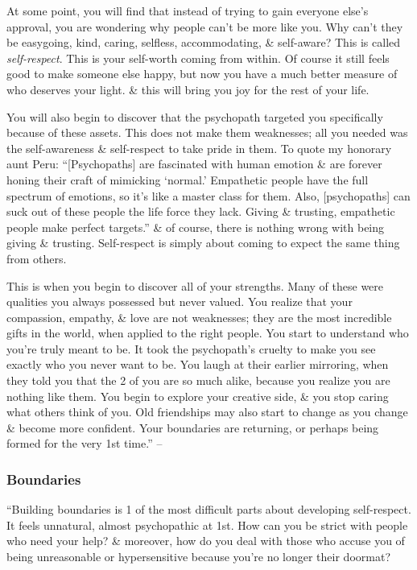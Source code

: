 \documentclass{article}
\numberwithin{equation}{section}
\begin{document}
At some point, you will find that instead of trying to gain everyone else's approval, you are wondering why people can't be more like you. Why can't they be easygoing, kind, caring, selfless, accommodating, \& self-aware? This is called \textit{self-respect}. This is your self-worth coming from within. Of course it still feels good to make someone else happy, but now you have a much better measure of who deserves your light. \& this will bring you joy for the rest of your life.

You will also begin to discover that the psychopath targeted you specifically because of these assets. This does not make them weaknesses; all you needed was the self-awareness \& self-respect to take pride in them. To quote my honorary aunt Peru: ``[Psychopaths] are fascinated with human emotion \& are forever honing their craft of mimicking `normal.' Empathetic people have the full spectrum of emotions, so it's like a master class for them. Also, [psychopaths] can suck out of these people the life force they lack. Giving \& trusting, empathetic people make perfect targets.'' \& of course, there is nothing wrong with being giving \& trusting. Self-respect is simply about coming to expect the same thing from others.

This is when you begin to discover all of your strengths. Many of these were qualities you always possessed but never valued. You realize that your compassion, empathy, \& love are not weaknesses; they are the most incredible gifts in the world, when applied to the right people. You start to understand who you're truly meant to be. It took the psychopath's cruelty to make you see exactly who you never want to be. You laugh at their earlier mirroring, when they told you that the 2 of you are so much alike, because you realize you are nothing like them. You begin to explore your creative side, \& you stop caring what others think of you. Old friendships may also start to change as you change \& become more confident. Your boundaries are returning, or perhaps being formed for the very 1st time.'' -- \cite[pp. 160--161]{MacKenzie2015}

\subsubsection{Boundaries}
``Building boundaries is 1 of the most difficult parts about developing self-respect. It feels unnatural, almost psychopathic at 1st. How can you be strict with people who need your help? \& moreover, how do you deal with those who accuse you of being unreasonable or hypersensitive because you're no longer their doormat?
\end{document}
